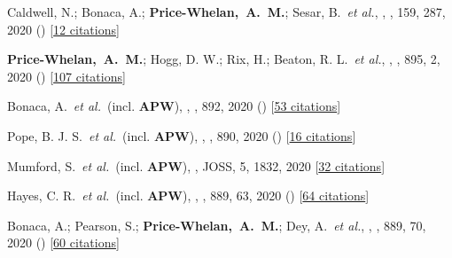\item[{\color{deemph}\scriptsize75}]Caldwell, N.; Bonaca, A.; \textbf{Price-Whelan,~A.~M.}; Sesar, B.~\textit{et al.}, , \aj, 159, 287, 2020 () [\href{http://adsabs.harvard.edu/abs/2020AJ....159..287C}{12 citations}]

\item[{\color{deemph}\scriptsize74}]\textbf{Price-Whelan,~A.~M.}; Hogg, D. W.; Rix, H.; Beaton, R. L.~\textit{et al.}, , \apj, 895, 2, 2020 () [\href{http://adsabs.harvard.edu/abs/2020ApJ...895....2P}{107 citations}]

\item[{\color{deemph}\scriptsize73}]Bonaca, A.~\textit{et al.}~(incl. \textbf{APW}), , \apj, 892, 2020 () [\href{http://adsabs.harvard.edu/abs/2020ApJ...892L..37B}{53 citations}]

\item[{\color{deemph}\scriptsize72}]Pope, B. J. S.~\textit{et al.}~(incl. \textbf{APW}), , \apj, 890, 2020 () [\href{http://adsabs.harvard.edu/abs/2020ApJ...890L..19P}{16 citations}]

\item[{\color{deemph}\scriptsize71}]Mumford, S.~\textit{et al.}~(incl. \textbf{APW}), , JOSS, 5, 1832, 2020 [\href{http://adsabs.harvard.edu/abs/2020JOSS....5.1832M}{32 citations}]

\item[{\color{deemph}\scriptsize70}]Hayes, C. R.~\textit{et al.}~(incl. \textbf{APW}), , \apj, 889, 63, 2020 () [\href{http://adsabs.harvard.edu/abs/2020ApJ...889...63H}{64 citations}]

\item[{\color{deemph}\scriptsize69}]Bonaca, A.; Pearson, S.; \textbf{Price-Whelan,~A.~M.}; Dey, A.~\textit{et al.}, , \apj, 889, 70, 2020 () [\href{http://adsabs.harvard.edu/abs/2020ApJ...889...70B}{60 citations}]

